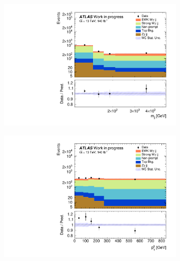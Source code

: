 \begin{figure}[htpb]
\centering
\begin{subfigure}[b]{0.48\textwidth}
    \centering
    \includegraphics[width=\textwidth]{plots/diffx/combined_stacks/data_vs_mc_mjj.pdf}
    \caption{}
\end{subfigure}
\hfill
\begin{subfigure}[b]{0.48\textwidth}
    \centering
    \includegraphics[width=\textwidth]{plots/diffx/combined_stacks/data_vs_mc_jj_pt.pdf}
    \caption{}
\end{subfigure}
\begin{subfigure}[b]{0.48\textwidth}
    \centering

\end{subfigure}
\end{figure}
